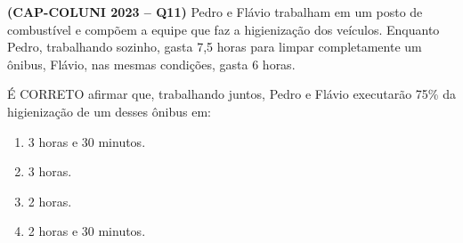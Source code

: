 \textbf{(CAP-COLUNI 2023 -- Q11)} Pedro e Flávio trabalham em um posto de combustível e compõem a equipe que faz a higienização dos veículos. Enquanto Pedro, trabalhando sozinho, gasta 7,5 horas para limpar completamente um ônibus, Flávio, nas mesmas condições, gasta 6 horas.

É CORRETO afirmar que, trabalhando juntos, Pedro e Flávio executarão 75\% da higienização de um desses ônibus em:

\begin{enumerate}
	\item 3 horas e 30 minutos.
	\item 3 horas.
	\item 2 horas.
	\item 2 horas e 30 minutos.
\end{enumerate}
